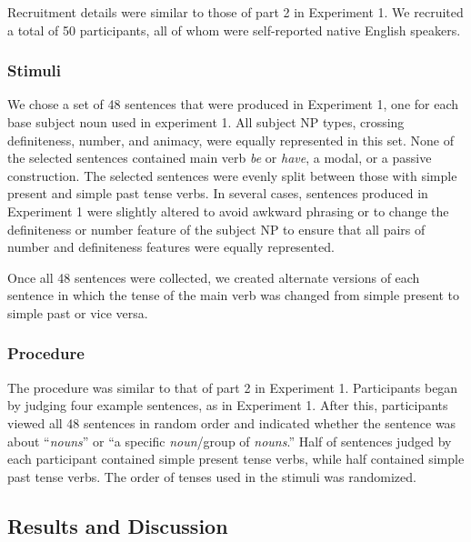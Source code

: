 \documentclass[10pt,letterpaper]{article}
\begin{document}
Recruitment details were similar to those of part 2 in Experiment 1. We recruited a total of 50 participants, all of whom were self-reported native English speakers.

\subsubsection{Stimuli}

We chose a set of 48 sentences that were produced in Experiment 1, one for each base subject noun used in experiment 1. All subject NP types, crossing definiteness, number, and animacy, were equally represented in this set. None of the selected sentences contained main verb \textit{be} or \textit{have}, a modal, or a passive construction. The selected sentences were evenly split between those with simple present and simple past tense verbs. In several cases, sentences produced in Experiment 1 were slightly altered to avoid awkward phrasing or to change the definiteness or number feature of the subject NP to ensure that all pairs of number and definiteness features were equally represented.

Once all 48 sentences were collected, we created alternate versions of each sentence in which the tense of the main verb was changed from simple present to simple past or vice versa.

\subsubsection{Procedure}

The procedure was similar to that of part 2 in Experiment 1. Participants began by judging four example sentences, as in Experiment 1. After this, participants viewed all 48 sentences in random order and indicated whether the sentence was about ``\textit{nouns}'' or ``a specific \textit{noun}/group of \textit{nouns}.'' Half of sentences judged by each participant contained simple present tense verbs, while half contained simple past tense verbs. The order of tenses used in the stimuli was randomized.

\subsection{Results and Discussion}
\end{document}
